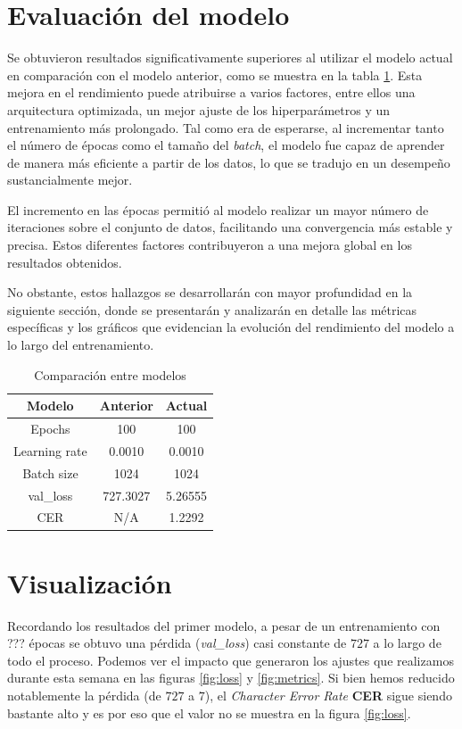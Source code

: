 \documentclass[10pt]{article}
\begin{document}
	\section{Evaluación del modelo}
	
	Se obtuvieron resultados significativamente superiores al utilizar el modelo actual en comparación con el modelo anterior, como se muestra en la tabla \ref{model_comp}. Esta mejora en el rendimiento puede atribuirse a varios factores, entre ellos una arquitectura optimizada, un mejor ajuste de los hiperparámetros y un entrenamiento más prolongado. Tal como era de esperarse, al incrementar tanto el número de épocas como el tamaño del \textit{batch}, el modelo fue capaz de aprender de manera más eficiente a partir de los datos, lo que se tradujo en un desempeño sustancialmente mejor.
	
	El incremento en las épocas permitió al modelo realizar un mayor número de iteraciones sobre el conjunto de datos, facilitando una convergencia más estable y precisa. Estos diferentes factores contribuyeron a una mejora global en los resultados obtenidos.
	
	No obstante, estos hallazgos se desarrollarán con mayor profundidad en la siguiente sección, donde se presentarán y analizarán en detalle las métricas específicas y los gráficos que evidencian la evolución del rendimiento del modelo a lo largo del entrenamiento.
	
	\begin{table}[!ht]
		\centering
		\caption{Comparación entre modelos}
		\label{model_comp}
		\begin{tabular}{|c|c|c|}
			\hline
			Modelo & Anterior & Actual \\
			\hline
			Epochs & 100 & 100 \\
			\hline
			Learning rate & 0.0010 & 0.0010 \\
			\hline
			Batch size & 1024 & 1024 \\
			\hline
			val\_loss & 727.3027 & 5.26555 \\
			\hline
			CER & N/A & 1.2292 \\
			\hline
		\end{tabular}
	\end{table}
	
	\section{Visualización}
	Recordando los resultados del primer modelo, a pesar de un entrenamiento con ??? épocas se obtuvo una pérdida (\textit{val\_loss}) casi constante de $727$ a lo largo de todo el proceso. Podemos ver el impacto que generaron los ajustes que realizamos durante esta semana en las figuras \ref{fig:loss} y \ref{fig:metrics}. Si bien hemos reducido notablemente la pérdida (de $727$ a $7$), el \textit{Character Error Rate} \textbf{CER} sigue siendo bastante alto y es por eso que el valor no se muestra en la figura \ref{fig:loss}.
	
\end{document}

